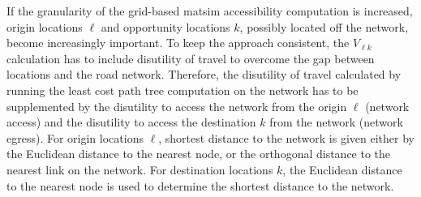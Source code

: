 If the granularity of the grid-based \gls{matsim} accessibility computation is increased, origin
locations $\ell$ and opportunity locations $k$, possibly located off the network, become increasingly 
important. To keep the approach consistent, the $V_{\ell k}$ calculation has to include disutility
of travel to overcome the gap between locations and the road network. Therefore, the disutility of travel
calculated by running the least cost path tree computation on the network has to be supplemented by the
disutility to access the network from the origin $\ell$ (network access) and the disutility to access the
destination $k$ from the network (network egress). For origin locations $\ell$, shortest distance to the
network is given either by the Euclidean distance to the nearest node, or the orthogonal distance to the
nearest link on the network.
For destination locations $k$, the Euclidean distance to the nearest node is used to determine
the shortest distance to the network.
%
%
%
%

